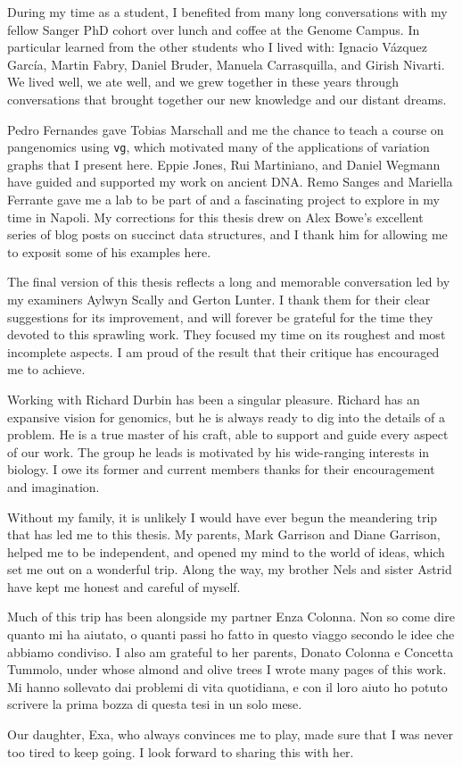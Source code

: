 \begin{acknowledgements}
  During my time as a student, I benefited from many long conversations with my fellow Sanger PhD cohort over lunch and coffee at the Genome Campus.
  In particular learned from the other students who I lived with: Ignacio V\'{a}zquez Garc\'{i}a, Martin Fabry, Daniel Bruder, Manuela Carrasquilla, and Girish Nivarti.
  We lived well, we ate well, and we grew together in these years through conversations that brought together our new knowledge and our distant dreams.

  Pedro Fernandes gave Tobias Marschall and me the chance to teach a course on pangenomics using {\tt vg}, which motivated many of the applications of variation graphs that I present here.
  Eppie Jones, Rui Martiniano, and Daniel Wegmann have guided and supported my work on ancient DNA.
  Remo Sanges and Mariella Ferrante gave me a lab to be part of and a fascinating project to explore in my time in Napoli.
  My corrections for this thesis drew on Alex Bowe's excellent series of blog posts on succinct data structures, and I thank him for allowing me to exposit some of his examples here.

  The final version of this thesis reflects a long and memorable conversation led by my examiners Aylwyn Scally and Gerton Lunter.
  I thank them for their clear suggestions for its improvement, and will forever be grateful for the time they devoted to this sprawling work.
  They focused my time on its roughest and most incomplete aspects.
  I am proud of the result that their critique has encouraged me to achieve.
  
  Working with Richard Durbin has been a singular pleasure.
  Richard has an expansive vision for genomics, but he is always ready to dig into the details of a problem.
  He is a true master of his craft, able to support and guide every aspect of our work.
  The group he leads is motivated by his wide-ranging interests in biology.
  I owe its former and current members thanks for their encouragement and imagination.

  Without my family, it is unlikely I would have ever begun the meandering trip that has led me to this thesis.
  My parents, Mark Garrison and Diane Garrison, helped me to be independent, and opened my mind to the world of ideas, which set me out on a wonderful trip.
  Along the way, my brother Nels and sister Astrid have kept me honest and careful of myself.

  Much of this trip has been alongside my partner Enza Colonna.
  Non so come dire quanto mi ha aiutato, o quanti passi ho fatto in questo viaggo secondo le idee che abbiamo condiviso.
  I also am grateful to her parents, Donato Colonna e Concetta Tummolo, under whose almond and olive trees I wrote many pages of this work.
  Mi hanno sollevato dai problemi di vita quotidiana, e con il loro aiuto ho potuto scrivere la prima bozza di questa tesi in un solo mese.
  
  Our daughter, Exa, who always convinces me to play, made sure that I was never too tired to keep going.
  I look forward to sharing this with her.

\end{acknowledgements}
